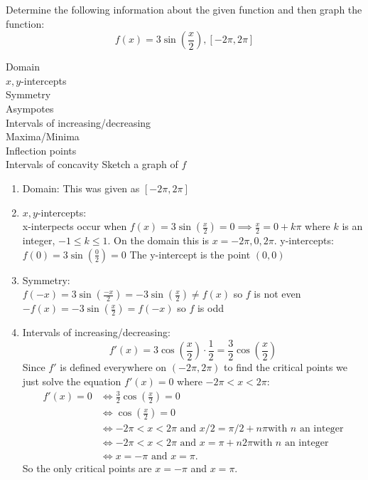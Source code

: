 \documentclass[nooutcomes]{ximera}
\begin{document}
\begin{problem}
  Determine the following information about the given function and then graph the function:
  \[
    f(x) = 3\sin\left(\frac{x}{2}\right), [-2\pi,2\pi]
  \]

 Domain\\
  $x,y$-intercepts\\
  Symmetry\\
  Asympotes\\
  Intervals of increasing/decreasing\\
  Maxima/Minima\\
  Inflection points\\
    Intervals of concavity
    Sketch a graph of $f$

\begin{freeResponse}
\begin{enumerate}

\item Domain: This was given as $[-2\pi,2\pi]$

\item $x,y$-intercepts:\\
x-interpects occur when $f(x) = 3\sin\left(\frac{x}{2}\right)=0 \implies \frac{x}{2}=0+k\pi$ where $k$ is an integer, $-1\le k \le 1$.  On the domain this is $x=-2\pi,0,2\pi$.
y-intercepts: $f(0) = 3\sin\left(\frac{0}{2}\right)=0$  The y-intercept is the point $(0,0)$

\item Symmetry:\\
$f(-x)=3\sin\left(\frac{-x}{2}\right)=-3\sin\left(\frac{x}{2}\right) \ne f(x)$ so $f$ is not even
$-f(x)=-3\sin\left(\frac{x}{2}\right)=f(-x)$ so $f$ is odd

\item Intervals of increasing/decreasing:
            \[
              f'(x) = 3 \cos\left(\frac{x}{2}\right) \cdot \frac{1}{2}
              = \frac{3}{2} \cos\left(\frac{x}{2}\right)
            \]
                  Since $f'$ is defined everywhere on $(-2\pi, 2\pi)$ to find
        the critical points we just solve the equation $f'(x) = 0$
        where $-2\pi < x < 2\pi$:
        \begin{align*}
          f'(x) = 0 &\iff \frac{3}{2} \cos\left(\frac{x}{2}\right) = 0
          \\
           &\iff \cos\left(\frac{x}{2}\right) = 0 \\
          &\iff \mbox{$-2\pi < x < 2\pi$ and $x/2 = \pi/2 + n\pi$
            with $n$ an integer}\\
          &\iff \mbox{$-2\pi < x < 2\pi$ and $x = \pi + n2\pi$
            with $n$ an integer}\\
          &\iff \mbox{$x = -\pi$ and $x = \pi$.}
        \end{align*}
        So the only critical points are $x = -\pi$ and $x = \pi$.\\
        

\end{enumerate}
\end{freeResponse}
\end{problem}
\end{document}
